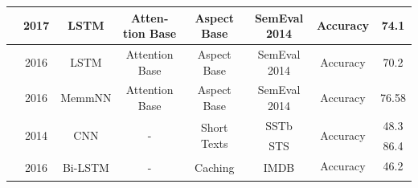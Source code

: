 \documentclass[12pt, a4paper, oneside]{report}
\begin{document}
\begin{tiny}
\begin{latin}
\begin{longtable}{|c|c|c|c|c|c|cc|}
        \cite{79ma2017interactive}                           & 2017                  & LSTM                              & Attention Base                          & Aspect Base                                                                                            & SemEval 2014                          & \multicolumn{1}{c|}{Accuracy}                                                                                                      & 74.1   \\ \hline
        \cite{73wang-etal-2016-attention}                    & 2016                  & LSTM                              & Attention Base                          & Aspect Base                                                                                            & SemEval 2014                          & \multicolumn{1}{c|}{Accuracy}                                                                                                      & 70.2   \\ \hline
        \cite{76tang2016aspect}                              & 2016                  & MemmNN                            & Attention Base                          & Aspect Base                                                                                            & SemEval 2014                          & \multicolumn{1}{c|}{Accuracy}                                                                                                      & 76.58  \\ \hline
        \multirow{2}{*}{\cite{dos2014deep}}                  & \multirow{2}{*}{2014} & \multirow{2}{*}{CNN}              & \multirow{2}{*}{-}                      & \multirow{2}{*}{Short Texts}                                                                           & SSTb                                  & \multicolumn{1}{c|}{\multirow{2}{*}{Accuracy}}                                                                                     & 48.3   \\ \cline{6-6} \cline{8-8} 
                                                                              &                       &                                   &                                         &                                                                                                        & STS                                   & \multicolumn{1}{c|}{}                                                                                                              & 86.4   \\ \hline
        \multirow{6}{*}{\cite{xu2016cached}}                 & \multirow{6}{*}{2016} & \multirow{6}{*}{Bi-LSTM}          & \multirow{6}{*}{-}                      & \multirow{6}{*}{Caching}                                                                               & \multirow{2}{*}{IMDB}                 & \multicolumn{1}{c|}{Accuracy}                                                                                                      & 46.2   \\ \cline{7-8} 

\end{longtable}
\end{latin}
\end{tiny}
\end{document}
